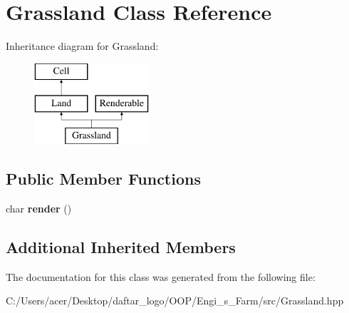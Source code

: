 \hypertarget{class_grassland}{}\section{Grassland Class Reference}
\label{class_grassland}
Inheritance diagram for Grassland\+:\begin{figure}[H]
\begin{center}
\leavevmode
\includegraphics[height=3.000000cm]{class_grassland}
\end{center}
\end{figure}
\subsection*{Public Member Functions}
\begin{DoxyCompactItemize}
\item 
\mbox{\label{class_grassland_a67098cf4cc401018ea41e63f51361684}} 
char {\bfseries render} ()
\end{DoxyCompactItemize}
\subsection*{Additional Inherited Members}


The documentation for this class was generated from the following file\+:\begin{DoxyCompactItemize}
\item 
C\+:/\+Users/acer/\+Desktop/daftar\+\_\+logo/\+O\+O\+P/\+Engi\+\_\+s\+\_\+\+Farm/src/Grassland.\+hpp\end{DoxyCompactItemize}
